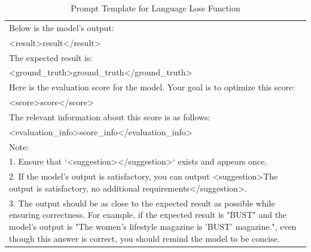\begin{table}[htbp]
{\begin{tabular}{p{15cm}}
Below is the model's output:\\
<result>{result}</result>\par\\

The expected result is:\\
<ground\_truth>{ground\_truth}</ground\_truth>\par\\

Here is the evaluation score for the model. Your goal is to optimize this score:\\
<score>{score}</score>\par\\

The relevant information about this score is as follows:\\
<evaluation\_info>{score\_info}</evaluation\_info>\par\\

Note:\\
1. Ensure that `<suggestion></suggestion>` exists and appears once.\\
2. If the model's output is satisfactory, you can output <suggestion>The output is satisfactory, no additional requirements</suggestion>.\\
3. The output should be as close to the expected result as possible while ensuring correctness. For example, if the expected result is "BUST" and the model's output is "The women's lifestyle magazine is 'BUST' magazine.", even though this answer is correct, you should remind the model to be concise.\\
\bottomrule
\end{tabular}
}
\caption{Prompt Template for Language Loss Function}
\label{tab:prompt_language_loss}
\end{table}

